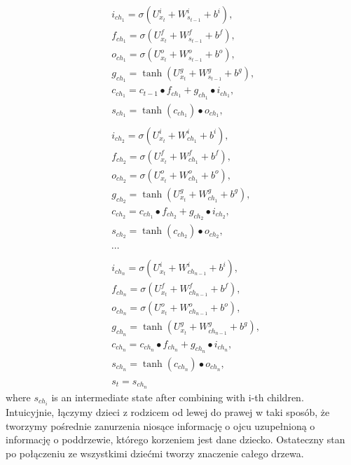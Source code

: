 \documentclass[10pt, a4paper]{article}
\begin{document}
\begin{equation}
\begin{split}
&i_{ch_1} = \sigma(U_{x_t}^i + W_{s_{t-1}}^i + b^i) ,\\
&f_{ch_1} = \sigma(U_{x_t}^f + W_{s_{t-1}}^f + b^f) ,\\
&o_{ch_1} = \sigma(U_{x_t}^o + W_{s_{t-1}}^o + b^o) ,\\
&g_{ch_1} = \tanh(U_{x_t}^g+ W_{s_{t-1}}^g + b^g) ,\\
&c_{ch_1} = c_{t-1} \bullet f_{ch_1} + g_{ch_1} \bullet i_{ch_1} ,\\
&s_{ch_1} = \tanh({c_{ch_1}}) \bullet o_{ch_1},\\\\
&i_{ch_2} = \sigma(U_{x_t}^i + W_{ch_1}^i + b^i) ,\\
&f_{ch_2} = \sigma(U_{x_t}^f + W_{ch_1}^f + b^f) ,\\
&o_{ch_2} = \sigma(U_{x_t}^o + W_{ch_1}^o + b^o) ,\\
&g_{ch_2} = \tanh(U_{x_t}^g+ W_{ch_1}^g + b^g) ,\\
&c_{ch_2} = c_{ch_1} \bullet f_{ch_2} + g_{ch_2} \bullet i_{ch_2} ,\\
&s_{ch_2} = \tanh(c_{ch_2}) \bullet o_{ch_2},\\\\
&\cdots\\\\
&i_{ch_n} = \sigma(U_{x_t}^i + W_{ch_{n-1}}^i + b^i) ,\\
&f_{ch_n} = \sigma(U_{x_t}^f + W_{ch_{n-1}}^f + b^f) ,\\
&o_{ch_n} = \sigma(U_{x_t}^o + W_{ch_{n-1}}^o + b^o) ,\\
&g_{ch_n} = \tanh(U_{x_t}^g+ W_{ch_{n-1}}^g + b^g) ,\\
&c_{ch_n} = c_{ch_n} \bullet f_{ch_n} + g_{ch_n} \bullet i_{ch_n} ,\\
&s_{ch_n} = \tanh(c_{ch_n}) \bullet o_{ch_n},\\\\
&s_{t} = s_{ch_n}
\end{split}
\end{equation}
	where $s_{ch_i}$ is an intermediate state after combining with i-th children.\\
Intuicyjnie, łączymy dzieci z rodzicem od lewej do prawej w taki sposób, że tworzymy pośrednie zanurzenia niosące informację o ojcu uzupełnioną o informację o poddrzewie, którego korzeniem jest dane dziecko.
Ostateczny stan po połączeniu ze wszystkimi dziećmi tworzy znaczenie całego drzewa.
\end{document}
